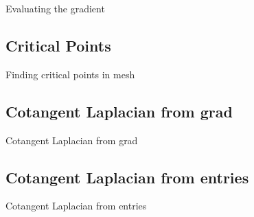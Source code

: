 \begin{algorithm}
\caption{Evaluating the gradient}
\begin{algorithmic}[1]

\EndProcedure
\end{algorithmic}
\end{algorithm}

\subsection{Critical Points}

\begin{algorithm}
\caption{Finding critical points in mesh}
\begin{algorithmic}[1]

\EndProcedure
\end{algorithmic}
\end{algorithm}

\subsection{Cotangent Laplacian from grad}

\begin{algorithm}
\caption{Cotangent Laplacian from grad}
\begin{algorithmic}[1]

\EndProcedure
\end{algorithmic}
\end{algorithm}

\subsection{Cotangent Laplacian from entries}


\begin{algorithm}
\caption{Cotangent Laplacian from entries}
\begin{algorithmic}[1]

\EndProcedure
\end{algorithmic}
\end{algorithm}
